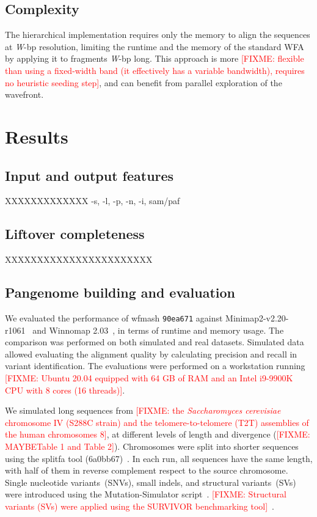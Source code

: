 \documentclass{bioinfo}
\theoremstyle{definition}
\newcommand{\red}[1]{{\textcolor{Red}{#1}}}
\newcommand{\FIXME}[1]{\red{[FIXME: #1]}}
\begin{document}
\subsection{Complexity}
The hierarchical implementation requires only the memory to align the sequences at \textit{W}-bp resolution, limiting the runtime and the memory of the standard WFA by applying it to fragments \textit{W}-bp long.
This approach is more \FIXME{flexible than using a fixed-width band (it effectively has a variable bandwidth), requires no heuristic seeding step}, and can benefit from parallel exploration of the wavefront.
\\

\section{Results}
\label{sec:results}

\subsection{Input and output features}
XXXXXXXXXXXXX -s, -l, -p, -n, -i, sam/paf

\subsection{Liftover completeness}
XXXXXXXXXXXXXXXXXXXXXXX

\subsection{Pangenome building and evaluation}
We evaluated the performance of wfmash \texttt{90ea671} against Minimap2-v2.20-r1061~\citep{Li_2018} and Winnomap 2.03~\citep{Jain_2020b}, in terms of runtime and memory usage.
The comparison was performed on both simulated and real datasets. Simulated data allowed evaluating the alignment quality by calculating precision and recall in variant identification.
The evaluations were performed on a workstation running \FIXME{Ubuntu 20.04 equipped with 64 GB of RAM and an Intel i9-9900K CPU with 8 cores (16 threads)}.

We simulated long sequences from \FIXME{the \textit{Saccharomyces cerevisiae} chromosome IV (S288C strain) and the telomere-to-telomere (T2T) assemblies of the human chromosomes 8}, at different levels of length and divergence (\FIXME{MAYBETable 1 and Table 2}).
Chromosomes were split into shorter sequences using the splitfa tool (6a0bb67)~\citep{splitfa-gh}.
In each run, all sequences have the same length, with half of them in reverse complement respect to the source chromosome.
Single nucleotide variants~(SNVs), small indels, and structural variants~(SVs) were introduced using the Mutation-Simulator script~\citep{Khl2020}.
\FIXME{Structural variants (SVs) were applied using the SURVIVOR benchmarking tool}~\citep{Jeffares2017}.
\end{document}
